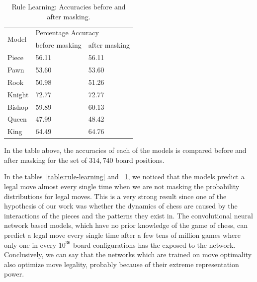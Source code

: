 \begin{table}[H]
\centering
\begin{tabular}{@{}lll@{}}
\toprule
\multirow{2}{*}{Model} & \multicolumn{2}{l}{Percentage Accuracy} \\ 
\cmidrule(l){2-3} 
                       & before masking      & after masking     \\ \midrule
Piece                  & 56.11               & 56.11             \\
Pawn                   & 53.60               & 53.60             \\
Rook                   & 50.98               & 51.26             \\
Knight                 & 72.77               & 72.77             \\
Bishop                 & 59.89               & 60.13             \\
Queen                  & 47.99               & 48.42             \\
King                   & 64.49               & 64.76             \\ 
\bottomrule
\end{tabular}
\caption{Rule Learning: Accuracies before and after masking.}
\small\justifying
In the table above, the accuracies of each of the models is compared before 
and after masking for the set of $314,740$ board positions.
\label{table:rule-learning-2}
\end{table}

In the tables~\ref{table:rule-learning} and ~\ref{table:rule-learning-2}, we 
noticed that the models predict a legal move almost every single time when we 
are not masking the probability distributions for legal moves. This is a very 
strong result since one of the hypothesis of our work was whether the dynamics 
of chess are caused by the interactions of the pieces and the patterns they 
exist in. The convolutional neural network based models, which have no prior 
knowledge of the game of chess, can predict a legal move every single time after 
a few tens of  million games where only one in every $10^{36}$ board 
configurations has the exposed to the network. Conclusively, we can say that the 
networks which are trained on move optimality also optimize move legality, 
probably because of their extreme representation power.\\

